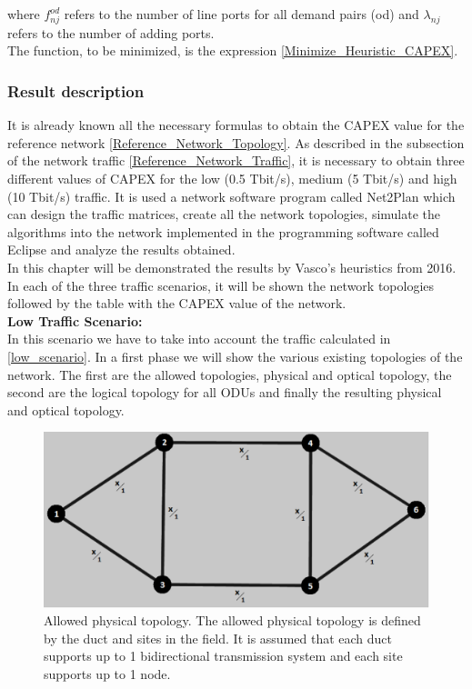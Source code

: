 \noindent
where $f_{nj}^{od}$ refers to the number of line ports for all demand pairs (od) and $\lambda_{nj}$ refers to the number of adding ports.\\

\noindent
The function, to be minimized, is the expression \ref{Minimize_Heuristic_CAPEX}.\\

\subsubsection{Result description}

It is already known all the necessary formulas to obtain the CAPEX value for the reference network \ref{Reference_Network_Topology}. As described in the subsection of the network traffic \ref{Reference_Network_Traffic}, it is necessary to obtain three different values of CAPEX for the low (0.5 Tbit/s), medium (5 Tbit/s) and high (10 Tbit/s) traffic. It is used a network software program called Net2Plan which can design the traffic matrices, create all the network topologies, simulate the algorithms into the network implemented in the programming software called Eclipse and analyze the results obtained.\\
In this chapter will be demonstrated the results by Vasco's heuristics from 2016. In each of the three traffic scenarios, it will be shown the network topologies followed by the table with the CAPEX value of the network.\\

\textbf{Low Traffic Scenario:}\\

In this scenario we have to take into account the traffic calculated in \ref{low_scenario}. In a first phase we will show the various existing topologies of the network. The first are the allowed topologies, physical and optical topology, the second are the logical topology for all ODUs and finally the resulting physical and optical topology.\\

\begin{figure}[H]
\centering
\includegraphics[width=13cm]{sdf/heuristic/transparent_protection/figures/allowed_physical}
\caption{Allowed physical topology. The allowed physical topology is defined by the duct and sites in the field. It is assumed that each duct supports up to 1 bidirectional transmission system and each site supports up to 1 node.}
\label{allowed_physical_protection_ref_low_heuristic_transparent}
\end{figure}

